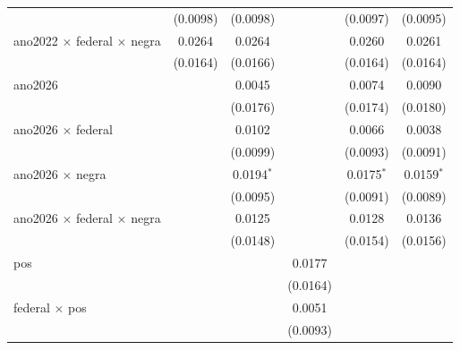 \begin{tabular}{lccccc}
                                             & (0.0098)              & (0.0098)        &                 & (0.0097)           & (0.0095)\\   
   ano2022 $\times$ federal $\times$ negra   & 0.0264                & 0.0264          &                 & 0.0260             & 0.0261\\   
                                             & (0.0164)              & (0.0166)        &                 & (0.0164)           & (0.0164)\\   
   ano2026                                   &                       & 0.0045          &                 & 0.0074             & 0.0090\\   
                                             &                       & (0.0176)        &                 & (0.0174)           & (0.0180)\\   
   ano2026 $\times$ federal                  &                       & 0.0102          &                 & 0.0066             & 0.0038\\   
                                             &                       & (0.0099)        &                 & (0.0093)           & (0.0091)\\   
   ano2026 $\times$ negra                    &                       & 0.0194$^{*}$    &                 & 0.0175$^{*}$       & 0.0159$^{*}$\\   
                                             &                       & (0.0095)        &                 & (0.0091)           & (0.0089)\\   
   ano2026 $\times$ federal $\times$ negra   &                       & 0.0125          &                 & 0.0128             & 0.0136\\   
                                             &                       & (0.0148)        &                 & (0.0154)           & (0.0156)\\   
   pos                                       &                       &                 & 0.0177          &                    &   \\   
                                             &                       &                 & (0.0164)        &                    &   \\   
   federal $\times$ pos                      &                       &                 & 0.0051          &                    &   \\   
                                             &                       &                 & (0.0093)        &                    &   \\   

\end{tabular}

